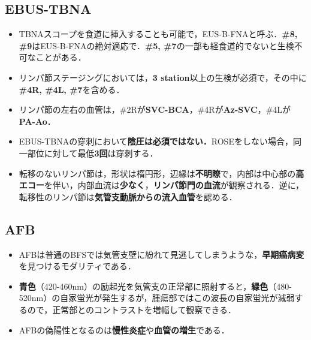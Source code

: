 \subsection{EBUS-TBNA}
\begin{itemize}
\item TBNAスコープを食道に挿入することも可能で，EUS-B-FNAと呼ぶ．\textbf{\#8, \#9}はEUS-B-FNAの絶対適応で．\textbf{\#5, \#7}の一部も経食道的でないと生検不可なことがある．
\item リンパ節ステージングにおいては，\textbf{3 station}以上の生検が必須で，その中に\textbf{\#4R, \#4L, \#7}を含める．
\item リンパ節の左右の血管は，\#2Rが\textbf{SVC-BCA}，\#4Rが\textbf{Az-SVC}，\#4Lが\textbf{PA-Ao}．
\item EBUS-TBNAの穿刺において\textbf{陰圧は必須ではない．}ROSEをしない場合，同一部位に対して最低\textbf{3回}は穿刺する．
\item 転移のないリンパ節は，形状は楕円形，辺縁は\textbf{不明瞭}で，内部は中心部の\textbf{高エコー}を伴い，内部血流は\textbf{少なく}，\textbf{リンパ節門の血流}が観察される．逆に，転移性のリンパ節は\textbf{気管支動脈からの流入血管}を認める．
\end{itemize}

\subsection{AFB}

\begin{itemize}

\item AFBは普通のBFSでは気管支壁に紛れて見逃してしまうような，\textbf{早期癌病変}を見つけるモダリティである．

\item \textbf{青色}（420-460nm）の励起光を気管支の正常部に照射すると，\textbf{緑色}（480-520nm）の自家蛍光が発生するが，腫瘍部ではこの波長の自家蛍光が減弱するので，正常部とのコントラストを増幅して観察できる．
\item AFBの偽陽性となるのは\textbf{慢性炎症}や\textbf{血管の増生}である．
\end{itemize}

